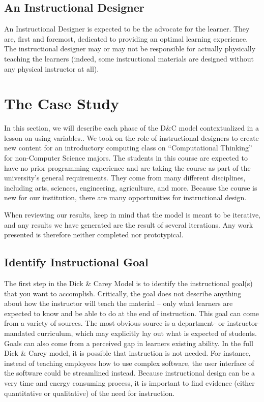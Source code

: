\documentclass{sig-alternate}
\begin{document}
\subsection{An Instructional Designer}
An Instructional Designer is expected to be the advocate for the learner.
They are, first and foremost, dedicated to providing an optimal learning experience.
The instructional designer may or may not be responsible for actually physically teaching the learners (indeed, some instructional materials are designed without any physical instructor at all).

\section{The Case Study}

In this section, we will describe each phase of the D\&C model contextualized in a lesson on using variables..
We took on the role of instructional designers to create new content for an introductory computing class on ``Computational Thinking'' for non-Computer Science majors.
The students in this course are expected to have no prior programming experience and are taking the course as part of the university's general requirements.
They come from many different disciplines, including arts, sciences, engineering, agriculture, and more.
Because the course is new for our institution, there are many opportunities for instructional design.

When reviewing our results, keep in mind that the model is meant to be iterative, and any results we have generated are the result of several iterations. 
Any work presented is therefore neither completed nor prototypical.

\subsection{Identify Instructional Goal}

The first step in the Dick \& Carey Model is to identify the instructional goal(s) that you want to accomplish.
Critically, the goal does not describe anything about how the instructor will teach the material -- only what learners are expected to know and be able to do at the end of instruction.
This goal can come from a variety of sources.
The most obvious source is a department- or instructor- mandated curriculum, which may explicitly lay out what is expected of students.
Goals can also come from a perceived gap in learners existing ability.
In the full Dick \& Carey model, it is possible that instruction is not needed.
For instance, instead of teaching employees how to use complex software, the user interface of the software could be streamlined instead.
Because instructional design can be a very time and energy consuming process, it is important to find evidence (either quantitative or qualitative) of the need for instruction.
\end{document}

